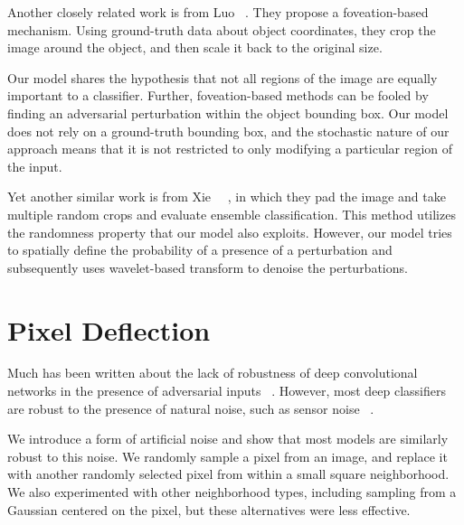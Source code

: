 Another closely related work is from Luo \etal ~\cite{FoveationbasedMALuo2015}. They propose a foveation-based mechanism.
Using ground-truth data about object coordinates, they crop the image around the object, and then scale it back to the original size.

Our model shares the hypothesis that not all regions of the image are equally important to a classifier.
Further, foveation-based methods can be fooled by finding an adversarial perturbation within the object bounding box.
Our model does not rely on a ground-truth bounding box, and the stochastic nature of our approach means that it is not restricted to only modifying a particular region of the input.

Yet another similar work is from Xie ~\etal ~\cite{MitigatingAnon208}, in which they pad the image and take multiple random crops and evaluate ensemble classification. 
This method utilizes the randomness property that our model also exploits. 
However, our model tries to spatially define the probability of a presence of a perturbation and subsequently uses wavelet-based transform to denoise the perturbations.




\section{Pixel Deflection \label{sec:pdrop}}

Much has been written about the lack of robustness of deep convolutional networks in the presence of adversarial inputs ~\cite{EasilyFNguyen2015DeepNN,IntriguingSzegedy2013}.
However, most deep classifiers are robust to the presence of natural noise, such as sensor noise ~\cite{DirtyPODiamond2017}. 

We introduce a form of artificial noise and show that most models are similarly robust to this noise.
We randomly sample a pixel from an image, and replace it with another randomly selected pixel from within a small square neighborhood.  We also experimented with other neighborhood types, including sampling from a Gaussian centered on the pixel, but these alternatives were less effective.
 


